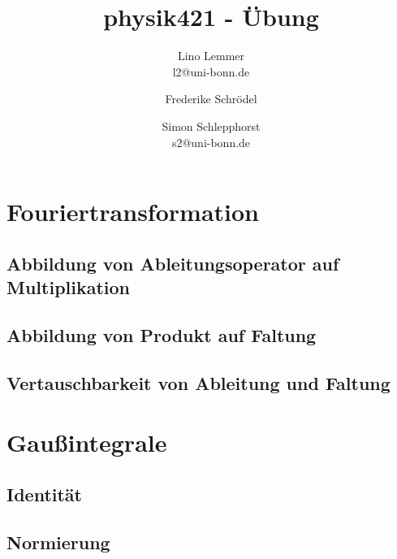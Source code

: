 

\setcounter{thezettel}{3}
\renewcommand\thesection{\arabic{thezettel}.\arabic{section}}


\title{physik421 - Übung }
\author{Lino Lemmer \\ \small{l2@uni-bonn.de} \and Frederike Schrödel \and Simon Schlepphorst\\ \small{s2@uni-bonn.de}}


\maketitle

\section{Fouriertransformation}

\subsection{Abbildung von Ableitungsoperator auf Multiplikation}

\subsection{}

\subsection{Abbildung von Produkt auf Faltung}

\subsection{Vertauschbarkeit von Ableitung und Faltung}

\section{Gaußintegrale}

\subsection{Identität}

\subsection{Normierung}

